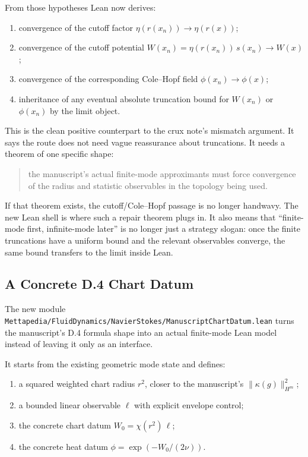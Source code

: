 \documentclass[11pt]{article}
\theoremstyle{remark}
\begin{document}
From those hypotheses Lean now derives:
\begin{enumerate}[leftmargin=1.5em]
  \item convergence of the cutoff factor \(\eta(r(x_n)) \to \eta(r(x))\);
  \item convergence of the cutoff potential
  \(W(x_n)=\eta(r(x_n))\,s(x_n)\to W(x)\);
  \item convergence of the corresponding Cole--Hopf field
  \(\phi(x_n) \to \phi(x)\);
  \item inheritance of any eventual absolute truncation bound for \(W(x_n)\) or
  \(\phi(x_n)\) by the limit object.
\end{enumerate}

This is the clean positive counterpart to the crux note's mismatch argument.
It says the route does not need vague reassurance about truncations.  It needs
a theorem of one specific shape:
\begin{quote}
the manuscript's actual finite-mode approximants must force convergence of the
radius and statistic observables in the topology being used.
\end{quote}

If that theorem exists, the cutoff/Cole--Hopf passage is no longer handwavy.
The new Lean shell is where such a repair theorem plugs in.  It also means that
``finite-mode first, infinite-mode later'' is no longer just a strategy slogan:
once the finite truncations have a uniform bound and the relevant observables
converge, the same bound transfers to the limit inside Lean.

\subsection{A Concrete D.4 Chart Datum}

The new module
\texttt{Mettapedia/FluidDynamics/NavierStokes/ManuscriptChartDatum.lean}
turns the manuscript's D.4 formula shape into an actual finite-mode Lean model
instead of leaving it only as an interface.

It starts from the existing geometric mode state and defines:
\begin{enumerate}[leftmargin=1.5em]
  \item a squared weighted chart radius \(r^2\), closer to the manuscript's
  \(\|\kappa(g)\|_{H^m}^2\);
  \item a bounded linear observable \(\ell\) with explicit envelope control;
  \item the concrete chart datum \(W_0 = \chi(r^2)\,\ell\);
  \item the concrete heat datum
  \(\phi = \exp(-W_0/(2\nu))\).
\end{enumerate}
\end{document}
